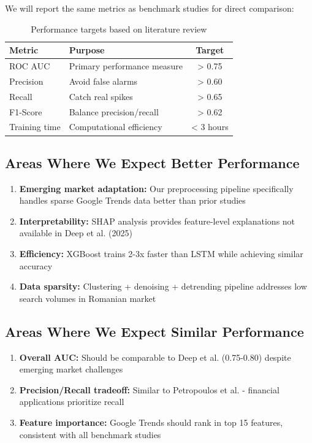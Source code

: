 \documentclass[12pt,a4paper]{article}
\begin{document}
We will report the same metrics as benchmark studies for direct comparison:

\begin{table}[h]
\centering
\begin{tabular}{llc}
\hline
\textbf{Metric} & \textbf{Purpose} & \textbf{Target} \\
\hline
ROC AUC & Primary performance measure & > 0.75 \\
Precision & Avoid false alarms & > 0.60 \\
Recall & Catch real spikes & > 0.65 \\
F1-Score & Balance precision/recall & > 0.62 \\
Training time & Computational efficiency & < 3 hours \\
\hline
\end{tabular}
\caption{Performance targets based on literature review}
\end{table}

\subsection{Areas Where We Expect Better Performance}

\begin{enumerate}
    \item \textbf{Emerging market adaptation:} Our preprocessing pipeline specifically handles sparse Google Trends data better than prior studies
    
    \item \textbf{Interpretability:} SHAP analysis provides feature-level explanations not available in Deep et al. (2025)
    
    \item \textbf{Efficiency:} XGBoost trains 2-3x faster than LSTM while achieving similar accuracy
    
    \item \textbf{Data sparsity:} Clustering + denoising + detrending pipeline addresses low search volumes in Romanian market
\end{enumerate}

\subsection{Areas Where We Expect Similar Performance}

\begin{enumerate}
    \item \textbf{Overall AUC:} Should be comparable to Deep et al. (0.75-0.80) despite emerging market challenges
    
    \item \textbf{Precision/Recall tradeoff:} Similar to Petropoulos et al. - financial applications prioritize recall
    
    \item \textbf{Feature importance:} Google Trends should rank in top 15 features, consistent with all benchmark studies
\end{enumerate}
\end{document}
